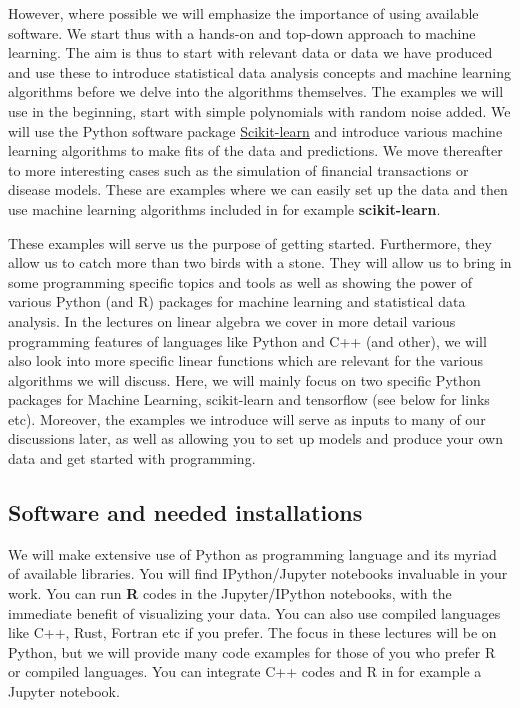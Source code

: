 \documentclass[%
oneside,                 %
final,                   %
10pt]{article}
\begin{document}
However, where possible we will emphasize the
importance of using available software. We start thus with a hands-on
and top-down approach to machine learning. The aim is thus to start with
relevant data or data we have produced 
and use these to introduce statistical data analysis
concepts and machine learning algorithms before we delve into the
algorithms themselves. The examples we will use in the beginning, start with simple
polynomials with random noise added. We will use the Python
software package \href{{http://scikit-learn.org/stable/}}{Scikit-learn} and
introduce various machine learning algorithms to make fits of
the data and predictions. We move thereafter to more interesting
cases such as the simulation of financial transactions or disease
models. These are examples where we can easily set up the data and
then use machine learning algorithms included in for example
\textbf{scikit-learn}. 

These examples will serve us the purpose of getting
started. Furthermore, they allow us to catch more than two birds with
a stone. They will allow us to bring in some programming specific
topics and tools as well as showing the power of various Python (and
R) packages for machine learning and statistical data analysis. In the
lectures on linear algebra we cover in more detail various programming
features of languages like Python and C++ (and other), we will also
look into more specific linear functions which are relevant for the
various algorithms we will discuss. Here, we will mainly focus on two
specific Python packages for Machine Learning, scikit-learn and
tensorflow (see below for links etc).  Moreover, the examples we
introduce will serve as inputs to many of our discussions later, as
well as allowing you to set up models and produce your own data and
get started with programming.





\subsection*{Software and needed installations}

We will make extensive use of Python as programming language and its
myriad of available libraries.  You will find
IPython/Jupyter notebooks invaluable in your work.  You can run \textbf{R}
codes in the Jupyter/IPython notebooks, with the immediate benefit of
visualizing your data. You can also use compiled languages like C++,
Rust, Fortran etc if you prefer. The focus in these lectures will be
on Python, but we will provide many code examples for those of you who
prefer R or compiled languages. You can integrate C++ codes and R in for example
a Jupyter notebook. 
\end{document}
